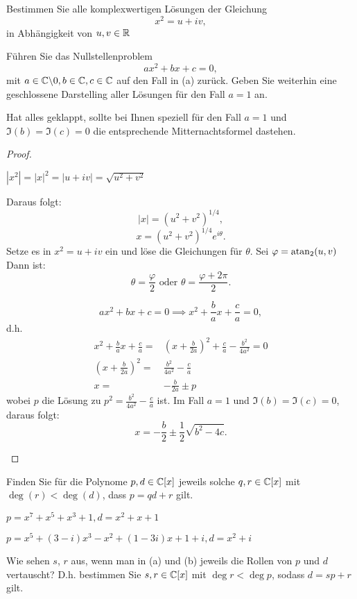 \begin{Problem}
	\begin{parts}	
		\item Bestimmen Sie alle komplexwertigen Lösungen der Gleichung
	\[
	x^2=u+iv,\] 
	in Abh\"{a}ngigkeit von $u,v\in \mathbb{R}$

\item F\"{u}hren Sie das Nullstellenproblem
	\[
		ax^2+bx+c=0,\]
		mit $a\in\mathbb{C}\backslash 0, b\in \mathbb{C}, c\in \mathbb{C}$ auf den Fall in (a) zur\"{u}ck. Geben Sie weiterhin eine geschlossene Darstelling aller L\"{o}sungen f\"{u}r den Fall $a=1$ an.

		Hat alles geklappt, sollte bei Ihnen speziell für den Fall $a = 1$ und $\Im(b) = \Im(c) = 0$ die entsprechende Mitternachtsformel dastehen.
		\end{parts}
\end{Problem}
\begin{proof}
	\begin{parts}
	\item $\left| x^2 \right| =|x|^2=|u+iv|=\sqrt{u^2+v^2}$ 

		Daraus folgt:
		\[
			|x|=(u^2+v^2)^{1 / 4}
		,\]
		\[
			x=(u^2+v^2)^{1 / 4}e^{i\theta} 
		.\] 
		Setze es in $x^2=u+iv$ ein und löse die Gleichungen für $\theta$. Sei $\varphi=\atan_2(u,v)$ Dann ist:
		 \[
			 \theta=\frac{\varphi}{2}\text{ oder }\theta=\frac{\varphi+2\pi}{2}
		 .\]

	\item \[
			ax^2+bx+c=0\implies x^2+\frac{b}{a}x+\frac{c}{a}=0
	,\]
	d.h.
	\begin{align*}
		x^2+\frac{b}{a}x+\frac{c}{a}=& \left( x+\frac{b}{2a} \right)^2+\frac{c}{a}-\frac{b^2}{4a^2}=0\\
		\left( x+\frac{b}{2a} \right)^2=&\frac{b^2}{4a^2}-\frac{c}{a}\\
		x=&-\frac{b}{2a}\pm p
	\end{align*}
	wobei $p$ die L\"{o}sung zu $p^2=\frac{b^2}{4a^2}-\frac{c}{a}$ ist. Im Fall $a=1$ und $\Im(b)=\Im(c)=0$, daraus folgt: 
	\[
	x=-\frac{b}{2}\pm \frac{1}{2}\sqrt{b^2-4c} 
	.\] 
	\end{parts}
\end{proof}
\begin{Problem}
	Finden Sie f\"{u}r die Polynome $p,d\in \mathbb{C}[x]$ jeweils solche $q,r\in \mathbb{C}[x]$ mit $\deg(r)<\deg(d)$, dass $p=qd+r$ gilt.
	\begin{parts}
	\item $p=x^7+x^5+x^3+1, d=x^2+x+1$
	\item $p=x^5+(3-i)x^3-x^2+(1-3i)x+1+i,d=x^2+i$
	\item  Wie sehen $s$, $r$ aus, wenn man in (a) und (b) jeweils die Rollen von $p$ und $d$ vertauscht? D.h. bestimmen Sie $s,r\in \mathbb{C}[x]$ mit $\deg r < \deg p$, sodass $d=sp+r$ gilt.
	\end{parts}
\end{Problem}
